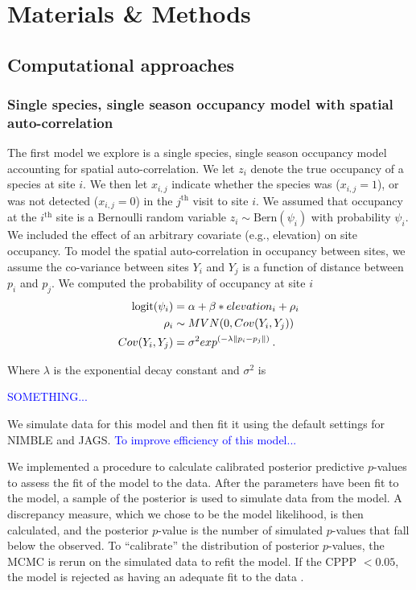 \documentclass[12pt]{article}
\newcommand{\flagged}[1] {
  \textcolor{blue}{#1}
}
\begin{document}
\section*{Materials \& Methods}
\label{sec:methods}
\subsection*{Computational approaches}

\subsubsection*{Single species, single season occupancy model with
  spatial auto-correlation}
The first model we explore is a single species, single season
occupancy model accounting for spatial auto-correlation. We let
$z_{i}$ denote the true occupancy of a species at site $i$.  We then
let $x_{i,j}$ indicate whether the species was ($x_{i,j}=1$), or was
not detected ($x_{i,j}=0$) in the $j^{\mathrm{th}}$ visit to site $i$.
We assumed that occupancy at the $i^{\mathrm{th}}$ site is a Bernoulli
random variable $z_{i} \sim \mathrm{Bern}(\psi_{i})$ with probability
$\psi_{i}$.  We included the effect of an arbitrary covariate (e.g.,
elevation) on site occupancy. To model the spatial auto-correlation in
occupancy between sites, we assume the co-variance between sites $Y_i$
and $Y_j$ is a function of distance between $p_i$ and $p_j$. We
computed the probability of occupancy at site $i$
%
\begin{equation}
  \begin{split}
    \label{eq:spatial}
    \mathrm{logit}(\psi_{i}) &=
    \alpha + \beta*elevation_i + \rho_i\hspace{0.2em}\\
    \rho_i &\sim MVN(0, {Cov}(Y_i,Y_j)) \hspace{0.2em}\\
    {Cov} (Y_i,Y_j) &= \sigma^2exp^{(-\lambda\|p_i-p_j\|)} \hspace{0.2em}.\\
  \end{split}
\end{equation}
%

Where $\lambda$ is the exponential decay constant and $\sigma^2$ is
\flagged{SOMETHING...}

We simulate data for this model and then fit it using the default
settings for NIMBLE and JAGS. \flagged{To improve efficiency of this
  model...}

We implemented a procedure to calculate calibrated posterior
predictive $p$-values \citep[CPPP, ][]{hjort-etal-06} to assess the
fit of the model to the data. After the parameters have been fit to
the model, a sample of the posterior is used to simulate data from the
model. A discrepancy measure, which we chose to be the model
likelihood, is then calculated, and the posterior $p$-value is the
number of simulated $p$-values that fall below the observed. To
``calibrate'' the distribution of posterior $p$-values, the MCMC is
rerun on the simulated data to refit the model. If the CPPP $< 0.05$,
the model is rejected as having an adequate fit to the data
\citep{hjort-etal-06}.
\end{document}
